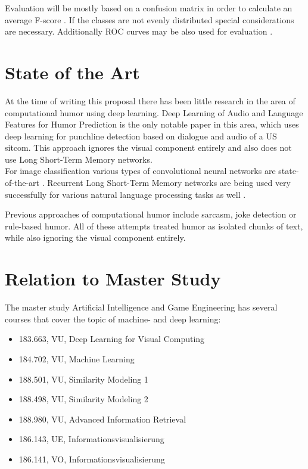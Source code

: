 \documentclass[draft,final]{vutinfth} %
\begin{document}
Evaluation will be mostly based on a confusion matrix in order to calculate an average F-score \cite{Powers2008EvaluationFP}. If the classes are not evenly distributed special considerations are necessary. Additionally ROC curves may be also used for evaluation \cite{Hand2001}. 

\chapter{State of the Art}

At the time of writing this proposal there has been little research in the area of computational humor using deep learning. Deep Learning of Audio and Language Features for Humor Prediction \cite{Bertero2016DeepLO} is the only notable paper in this area, which uses deep learning for punchline detection based on dialogue and audio of a US sitcom. This approach ignores the visual component entirely and also does not use Long Short-Term Memory networks. \\

For image classification various types of convolutional neural networks are state-of-the-art \cite{dogsvscats}. Recurrent Long Short-Term Memory networks are being used very successfully for various natural language processing tasks as well \cite[page 4]{reviewRNN}. \\
\pagebreak

Previous approaches of computational humor include sarcasm\cite{Bamman2015ContextualizedSD}, joke detection\cite{Yang2015HumorRA} or rule-based humor\cite{HumoristBot}. All of these attempts treated humor as isolated chunks of text, while also ignoring the visual component entirely.

\chapter{Relation to Master Study}
The master study Artificial Intelligence and Game Engineering has several courses that cover the topic of machine- and deep learning:

\begin{itemize}
\item 183.663, VU, Deep  Learning  for  Visual  Computing
\item 184.702, VU, Machine Learning
\item 188.501, VU, Similarity Modeling 1
\item 188.498, VU, Similarity Modeling 2
\item 188.980, VU, Advanced Information Retrieval
\item 186.143, UE, Informationsvisualisierung 
\item 186.141, VO, Informationsvisualisierung 
\end{itemize}
\end{document}
